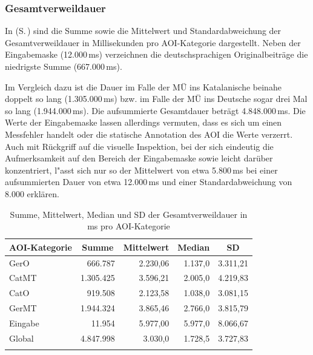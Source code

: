 
\subsubsection{Gesamtverweildauer}

\label{K6:subsubsec:dwelltime:catde}


In  (S.\,\pageref{K6:tab:CatDe:mean-sd-dwell}) sind die Summe sowie die Mittelwert und Standardabweichung der Gesamtverweildauer in Millisekunden pro AOI-Kategorie dargestellt. Neben der Eingabemaske (12.000\,ms) verzeichnen die deutschsprachigen Originalbeiträge die niedrigste Summe (667.000\,ms). 

Im Vergleich dazu ist die Dauer im Falle der MÜ ins Katalanische beinahe doppelt so lang (1.305.000\,ms) bzw. im Falle der MÜ ins Deutsche sogar drei Mal so lang (1.944.000\,ms). Die aufsummierte Gesamtdauer beträgt 4.848.000\,ms. Die Werte der Eingabemaske lassen allerdings vermuten, dass es sich um einen Messfehler handelt oder die statische Annotation des AOI die Werte verzerrt. Auch mit Rückgriff auf die visuelle Inspektion, bei der sich eindeutig die Aufmerksamkeit auf den Bereich der Eingabemaske sowie leicht darüber konzentriert, l"asst sich nur so der Mittelwert von etwa 5.800\,ms bei einer aufsummierten Dauer von etwa 12.000\,ms und einer Standardabweichung von 8.000 erklären.


\begin{table}
    \begin{tabular}{lrrrr}
    \lsptoprule
        {AOI-Kategorie} & \multicolumn{1}{c}{Summe} & \multicolumn{1}{c}{Mittelwert} & \multicolumn{1}{c}{Median} & \multicolumn{1}{c}{SD} \\ 
        \midrule
        GerO & 666.787  & 2.230,06 & 1.137,0 & 3.311,21 \\ 
        CatMT & 1.305.425  & 3.596,21 & 2.005,0 & 4.219,83 \\ 
        CatO  & 919.508 & 2.123,58 & 1.038,0 & 3.081,15 \\ 
        GerMT & 1.944.324  & 3.865,46 & 2.766,0 & 3.815,79 \\ 
        Eingabe & 11.954 & 5.977,00 & 5.977,0 & 8.066,67 \\ 
        \midrule
        Global & 4.847.998 &  3.030,0 & 1.728,5 & 3.727,83 \\ 
        \lspbottomrule
    \end{tabular}
        \caption[Summe, Mittelwert, Median und SD der Gesamtverweildauer]{Summe, Mittelwert, Median und SD der Gesamtverweildauer in ms pro AOI-Kategorie}
    \label{K6:tab:CatDe:mean-sd-dwell}
\end{table}

